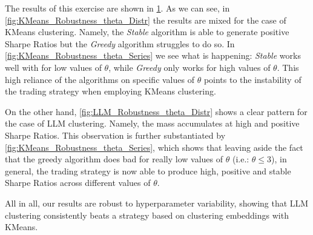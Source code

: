 \begin{figure}[H]
\mx 
{}

\label{fig:Robustness_theta}
\end{figure}


The results of this exercise are shown in \cref{fig:Robustness_theta}. As we can see, in \cref{fig:KMeans_Robustness_theta_Distr} the results are mixed for the case of KMeans clustering. Namely, the \textit{Stable} algorithm is able to generate positive Sharpe Ratios but the \textit{Greedy} algorithm struggles to do so. In \cref{fig:KMeans_Robustness_theta_Series} we see what is happening: \textit{Stable} works well with for low values of $\theta$, while \textit{Greedy} only works for high values of $\theta$. This high reliance of the algorithms on specific values of $\theta$ points to the instability of the trading strategy when employing KMeans clustering.

\mx 
On the other hand, \cref{fig:LLM_Robustness_theta_Distr} shows a clear pattern for the case of LLM clustering. Namely, the mass accumulates at high and positive Sharpe Ratios. This observation is further substantiated by \cref{fig:KMeans_Robustness_theta_Series}, which shows that leaving aside the fact that the greedy algorithm does bad for really low values of $\theta$ (i.e.: $\theta\leq 3$), in general, the trading strategy is now able to produce high, positive and stable Sharpe Ratios across different values of $\theta$.  

\mx
All in all, our results are robust to hyperparameter variability, showing that LLM clustering consistently beats a strategy based on clustering embeddings with KMeans. 
